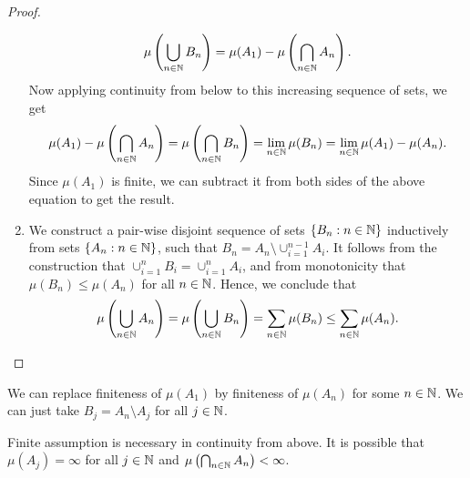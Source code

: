 \documentclass[a4paper,english,12pt]{article}
\begin{document}
\begin{proof}
\begin{enumerate}
	\begin{align*}
	\mu\left(\bigcup_{n \in \mathbb{N}} B_n\right) = \mu(A_1) - \mu\left(\bigcap_{n \in \mathbb{N}} A_n\right).
	\end{align*} 
	Now applying continuity from below to this increasing sequence of sets, we get 
	\begin{align*}
	\mu(A_1) - \mu\left(\bigcap_{n \in \mathbb{N}} A_n\right) = \mu\left(\bigcap_{n \in \mathbb{N}} B_n\right) = \lim_{n \in \mathbb{N}}\mu(B_n) = \lim_{n \in \mathbb{N}}\mu(A_1) - \mu(A_n).
	\end{align*}
	Since $\mu(A_1)$ is finite, we can subtract it from both sides of the above equation to get the result.
	\item We construct a pair-wise disjoint sequence of sets $\{B_n: n \in \mathbb{N}\}$ inductively from sets $\{A_n: n \in \mathbb{N}\}$, such that $B_n = A_n \setminus \cup_{i=1}^{n-1}A_i$. It follows from the construction that $\cup_{i=1}^nB_i = \cup_{i=1}^nA_i$, and from monotonicity that $\mu(B_n) \leq \mu(A_n)$ for all $n \in \mathbb{N}$. Hence, we conclude that
	\begin{align*}
	\mu\left(\bigcup_{n \in \mathbb{N}} A_n\right) = \mu\left(\bigcup_{n \in \mathbb{N}} B_n\right) = \sum_{n \in \mathbb{N}}\mu(B_n) \leq \sum_{n \in \mathbb{N}}\mu(A_n).
	\end{align*}
\end{enumerate}
\end{proof}	

\begin{rem} 
We can replace finiteness of $\mu(A_1)$ by finiteness of $\mu(A_n)$ for some $n \in \mathbb{N}$. We can just take $B_j = A_n \setminus A_j$ for all $j \in \mathbb{N}$.
\end{rem}
\begin{rem} Finite assumption is necessary in continuity from above. It is possible that $\mu(A_j) = \infty$ for all $j \in \mathbb{N}$ and $\mu\left(\bigcap_{n \in \mathbb{N}}A_n\right)  < \infty$. %
\end{rem}
\end{document}
